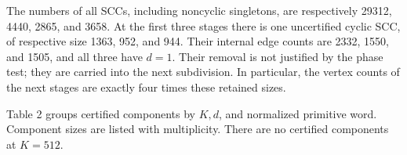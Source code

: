 \documentclass[11pt,reqno]{amsart}
\theoremstyle{definition}
\theoremstyle{remark}
\begin{document}
The numbers of all SCCs, including noncyclic singletons, are respectively
29312, 4440, 2865, and 3658. At the first three stages there is one
uncertified cyclic SCC, of respective size 1363, 952, and 944. Their
internal edge counts are 2332, 1550, and 1505, and all three have \(d=1\).
Their removal is not justified by the phase test; they are carried into
the next subdivision. In particular, the vertex counts of the next stages
are exactly four times these retained sizes.

Table 2 groups certified components by \(K,d\), and normalized primitive
word. Component sizes are listed with multiplicity. There are no certified
components at \(K=512\).

\end{document}

